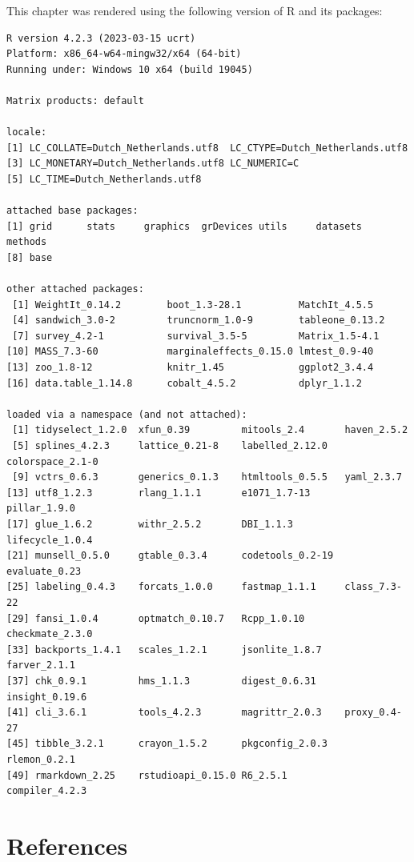 \documentclass[
  letterpaper,
  DIV=11,
  numbers=noendperiod]{scrreprt}
\begin{document}
This chapter was rendered using the following version of R and its
packages:

\begin{verbatim}
R version 4.2.3 (2023-03-15 ucrt)
Platform: x86_64-w64-mingw32/x64 (64-bit)
Running under: Windows 10 x64 (build 19045)

Matrix products: default

locale:
[1] LC_COLLATE=Dutch_Netherlands.utf8  LC_CTYPE=Dutch_Netherlands.utf8   
[3] LC_MONETARY=Dutch_Netherlands.utf8 LC_NUMERIC=C                      
[5] LC_TIME=Dutch_Netherlands.utf8    

attached base packages:
[1] grid      stats     graphics  grDevices utils     datasets  methods  
[8] base     

other attached packages:
 [1] WeightIt_0.14.2        boot_1.3-28.1          MatchIt_4.5.5         
 [4] sandwich_3.0-2         truncnorm_1.0-9        tableone_0.13.2       
 [7] survey_4.2-1           survival_3.5-5         Matrix_1.5-4.1        
[10] MASS_7.3-60            marginaleffects_0.15.0 lmtest_0.9-40         
[13] zoo_1.8-12             knitr_1.45             ggplot2_3.4.4         
[16] data.table_1.14.8      cobalt_4.5.2           dplyr_1.1.2           

loaded via a namespace (and not attached):
 [1] tidyselect_1.2.0  xfun_0.39         mitools_2.4       haven_2.5.2      
 [5] splines_4.2.3     lattice_0.21-8    labelled_2.12.0   colorspace_2.1-0 
 [9] vctrs_0.6.3       generics_0.1.3    htmltools_0.5.5   yaml_2.3.7       
[13] utf8_1.2.3        rlang_1.1.1       e1071_1.7-13      pillar_1.9.0     
[17] glue_1.6.2        withr_2.5.2       DBI_1.1.3         lifecycle_1.0.4  
[21] munsell_0.5.0     gtable_0.3.4      codetools_0.2-19  evaluate_0.23    
[25] labeling_0.4.3    forcats_1.0.0     fastmap_1.1.1     class_7.3-22     
[29] fansi_1.0.4       optmatch_0.10.7   Rcpp_1.0.10       checkmate_2.3.0  
[33] backports_1.4.1   scales_1.2.1      jsonlite_1.8.7    farver_2.1.1     
[37] chk_0.9.1         hms_1.1.3         digest_0.6.31     insight_0.19.6   
[41] cli_3.6.1         tools_4.2.3       magrittr_2.0.3    proxy_0.4-27     
[45] tibble_3.2.1      crayon_1.5.2      pkgconfig_2.0.3   rlemon_0.2.1     
[49] rmarkdown_2.25    rstudioapi_0.15.0 R6_2.5.1          compiler_4.2.3   
\end{verbatim}

\hypertarget{references}{%
\section*{References}\label{references}}
\end{document}
